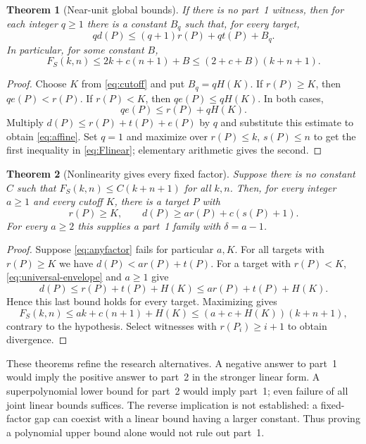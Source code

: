 \documentclass[11pt]{article}
\newtheorem{theorem}{Theorem}[section]
\theoremstyle{definition}
\theoremstyle{remark}
\begin{document}
\begin{theorem}[Near-unit global bounds]\label{thm:affine}
If there is no part~1 witness, then for each integer $q\ge1$ there is a
constant $B_q$ such that, for every target,
\begin{equation}\label{eq:affine}
 qd(P)\le(q+1)r(P)+qt(P)+B_q.
\end{equation}
In particular, for some constant $B$,
\begin{equation}\label{eq:Flinear}
 F_S(k,n)\le 2k+c(n+1)+B
 \le (2+c+B)(k+n+1).
\end{equation}
\end{theorem}
\begin{proof}
Choose $K$ from \eqref{eq:cutoff} and put $B_q=qH(K)$. If $r(P)\ge K$,
then $qe(P)<r(P)$. If $r(P)<K$, then $qe(P)\le qH(K)$. In both cases,
\[
 qe(P)\le r(P)+qH(K).
\]
Multiply $d(P)\le r(P)+t(P)+e(P)$ by $q$ and substitute this estimate to
obtain \eqref{eq:affine}. Set $q=1$ and maximize over $r(P)\le k$,
$s(P)\le n$ to get the first inequality in \eqref{eq:Flinear}; elementary
arithmetic gives the second.
\end{proof}

\begin{theorem}[Nonlinearity gives every fixed factor]\label{thm:nonlinear}
Suppose there is no constant $C$ such that
$F_S(k,n)\le C(k+n+1)$ for all $k,n$. Then, for every integer $a\ge1$ and
every cutoff $K$, there is a target $P$ with
\begin{equation}\label{eq:anyfactor}
 r(P)\ge K,\qquad d(P)\ge a r(P)+c(s(P)+1).
\end{equation}
For every $a\ge2$ this supplies a part~1 family with $\delta=a-1$.
\end{theorem}
\begin{proof}
Suppose \eqref{eq:anyfactor} fails for particular $a,K$. For all targets
with $r(P)\ge K$ we have $d(P)<ar(P)+t(P)$. For a target with $r(P)<K$,
\eqref{eq:universal-envelope} and $a\ge1$ give
\[
 d(P)\le r(P)+t(P)+H(K)\le ar(P)+t(P)+H(K).
\]
Hence this last bound holds for every target. Maximizing gives
\[
 F_S(k,n)\le ak+c(n+1)+H(K)
 \le (a+c+H(K))(k+n+1),
\]
contrary to the hypothesis. Select witnesses with $r(P_i)\ge i+1$ to obtain
divergence.
\end{proof}

These theorems refine the research alternatives. A negative answer to part~1
would imply the positive answer to part~2 in the stronger linear form.
A superpolynomial lower bound for part~2 would imply part~1; even failure of
all joint linear bounds suffices. The reverse implication is not established:
a fixed-factor gap can coexist with a linear bound having a larger constant.
Thus proving a polynomial upper bound alone would not rule out part~1.
\end{document}

